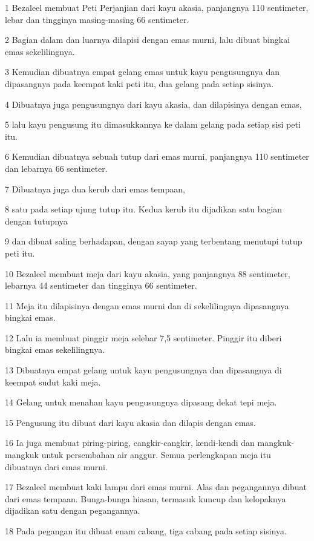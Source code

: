 \par 1 Bezaleel membuat Peti Perjanjian dari kayu akasia, panjangnya 110 sentimeter, lebar dan tingginya masing-masing 66 sentimeter.
\par 2 Bagian dalam dan luarnya dilapisi dengan emas murni, lalu dibuat bingkai emas sekelilingnya.
\par 3 Kemudian dibuatnya empat gelang emas untuk kayu pengusungnya dan dipasangnya pada keempat kaki peti itu, dua gelang pada setiap sisinya.
\par 4 Dibuatnya juga pengusungnya dari kayu akasia, dan dilapisinya dengan emas,
\par 5 lalu kayu pengusung itu dimasukkannya ke dalam gelang pada setiap sisi peti itu.
\par 6 Kemudian dibuatnya sebuah tutup dari emas murni, panjangnya 110 sentimeter dan lebarnya 66 sentimeter.
\par 7 Dibuatnya juga dua kerub dari emas tempaan,
\par 8 satu pada setiap ujung tutup itu. Kedua kerub itu dijadikan satu bagian dengan tutupnya
\par 9 dan dibuat saling berhadapan, dengan sayap yang terbentang menutupi tutup peti itu.
\par 10 Bezaleel membuat meja dari kayu akasia, yang panjangnya 88 sentimeter, lebarnya 44 sentimeter dan tingginya 66 sentimeter.
\par 11 Meja itu dilapisinya dengan emas murni dan di sekelilingnya dipasangnya bingkai emas.
\par 12 Lalu ia membuat pinggir meja selebar 7,5 sentimeter. Pinggir itu diberi bingkai emas sekelilingnya.
\par 13 Dibuatnya empat gelang untuk kayu pengusungnya dan dipasangnya di keempat sudut kaki meja.
\par 14 Gelang untuk menahan kayu pengusungnya dipasang dekat tepi meja.
\par 15 Pengusung itu dibuat dari kayu akasia dan dilapis dengan emas.
\par 16 Ia juga membuat piring-piring, cangkir-cangkir, kendi-kendi dan mangkuk-mangkuk untuk persembahan air anggur. Semua perlengkapan meja itu dibuatnya dari emas murni.
\par 17 Bezaleel membuat kaki lampu dari emas murni. Alas dan pegangannya dibuat dari emas tempaan. Bunga-bunga hiasan, termasuk kuncup dan kelopaknya dijadikan satu dengan pegangannya.
\par 18 Pada pegangan itu dibuat enam cabang, tiga cabang pada setiap sisinya.
